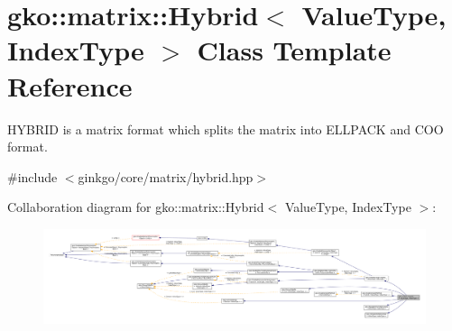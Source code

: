 \hypertarget{classgko_1_1matrix_1_1Hybrid}{}\section{gko\+:\+:matrix\+:\+:Hybrid$<$ Value\+Type, Index\+Type $>$ Class Template Reference}
\label{classgko_1_1matrix_1_1Hybrid}


H\+Y\+B\+R\+ID is a matrix format which splits the matrix into E\+L\+L\+P\+A\+CK and C\+OO format.  




{\ttfamily \#include $<$ginkgo/core/matrix/hybrid.\+hpp$>$}



Collaboration diagram for gko\+:\+:matrix\+:\+:Hybrid$<$ Value\+Type, Index\+Type $>$\+:
\nopagebreak
\begin{figure}[H]
\begin{center}
\leavevmode
\includegraphics[width=350pt]{classgko_1_1matrix_1_1Hybrid__coll__graph}
\end{center}
\end{figure}
